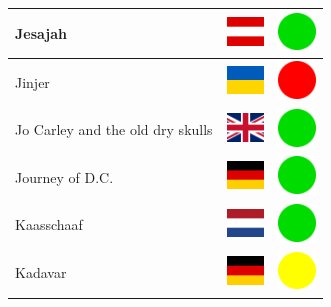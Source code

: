 \documentclass[12pt, a4paper, twoside]{report}
\begin{document}
\begin{center}
\begin{longtable}{|p{5cm}|p{2cm}|p{2cm}|}
Jesajah & \includegraphics[width=1cm]{4x3/at} & \includegraphics[width=1cm]{likes/y} \\ \hline
Jinjer & \includegraphics[width=1cm]{4x3/ua} & \includegraphics[width=1cm]{likes/n} \\ \hline
Jo Carley and the old dry skulls & \includegraphics[width=1cm]{4x3/gb} & \includegraphics[width=1cm]{likes/y} \\ \hline
Journey of D.C. & \includegraphics[width=1cm]{4x3/de} & \includegraphics[width=1cm]{likes/y} \\ \hline
Kaasschaaf & \includegraphics[width=1cm]{4x3/nl} & \includegraphics[width=1cm]{likes/y} \\ \hline
Kadavar & \includegraphics[width=1cm]{4x3/de} & \includegraphics[width=1cm]{likes/m} \\ \hline

\end{longtable}
\end{center}
\end{document}
